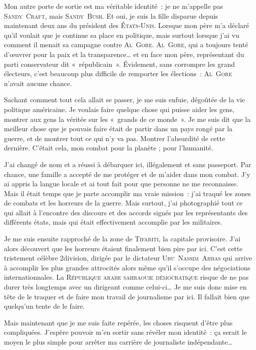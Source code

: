 {	Mon autre porte de sortie est ma véritable identité~:  je ne m’appelle pas \textsc{Sandy~Craft}, mais \textsc{Sandy~Bush}.
	Et oui, je suis la fille disparue depuis maintenant deux ans du président des \textsc{États-Unis}.
	Lorsque mon père m’a déclaré qu’il voulait que je continue sa place en politique, mais surtout lorsque j’ai vu comment il menait sa campagne contre \textsc{Al~Gore}.
	\textsc{Al~Gore}, qui a toujours tenté d’œuvrer pour la paix et la transparence… et en face mon père, représentant du parti conservateur dit «~républicain~».
	Évidement, sans corrompre les grand électeurs, c’est beaucoup plus difficile de remporter les élections~:  \textsc{Al~Gore} n’avait aucune chance.

	Sachant comment tout cela allait se passer, je me suis enfuie, dégoûtée de la vie politique américaine.
	Je voulais faire quelque chose qui puisse aider les gens, montrer aux gens la véritée sur les «~grands de ce monde~».
	Je me suis dit que la meilleur chose que je pouvais faire était de partir dans un pays rongé par la guerre, et de montrer tout ce qui n’y va pas.
	Montrer l’absurdité de cette dernière.  C’était cela, mon combat pour la planète ; pour l’humanité.

	J’ai changé de nom et a réussi à débarquer ici, illégalement et sans passeport.
	Par chance, une famille a accepté de me protéger et de m’aider dans mon combat.
	J’y ai appris la langue locale et ai tout fait pour que personne ne me reconnaisse.
	Mais il était temps que je parte accomplir ma vraie mission~:  j’ai traqué les zones de combats et les horreurs de la guerre.
	Mais surtout, j’ai photographié tout ce qui allait à l’encontre des discours et des accords signés par les représentants des différents états, mais qui était effectivement accomplie par les militaires.

	Je me suis ensuite rapproché de la zone de \textsc{Tifariti}, la capitale provisoire.
	J’ai alors découvert que les horreurs étaient finalement bien pire par ici.
	C’est cette tristement célèbre 2\ieme division, dirigée par le dictateur \textsc{Ubu~Nassim~Abbas} qui arrive à accomplir les plus grandes attrocités alors même qu’il s’occupe des négociations internationnales.
	La \textsc{République arabe sahraouie démocratique} risque de ne pas durer très longtemps avec un dirigeant comme celui-ci…
	Je me suis donc mise en tête de le traquer et de faire mon travail de journalisme par ici.
	Il fallait bien que quelqu’un tente de le faire.

	Mais maintenant que je me suis faite repérée, les choses risquent d’être plus compliquées.
	J’espère pouvoir m’en sortir sans révéler mon identité~:  ça serait le moyen le plus simple pour arrêter ma carrière de journaliste indépendante…
}



